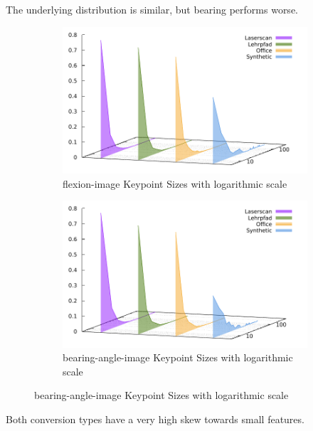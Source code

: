 The underlying distribution is similar, but bearing performs worse.
\begin{figure}[H]
\begin{subfigure}[t]{0.45\linewidth}
    \includegraphics[width=\linewidth]{chapter06/results/SIFT/flexion/size.pdf}%
    \caption{\gls{flexion-image} Keypoint Sizes with logarithmic scale}
\end{subfigure}\quad
\begin{subfigure}[t]{0.45\linewidth}
    \includegraphics[width=\linewidth]{chapter06/results/SIFT/bearing/size.pdf}%
    \caption{\gls{bearing-angle-image} Keypoint Sizes with logarithmic scale}
\end{subfigure}
\end{figure}
Both conversion types have a very high skew towards small features.

